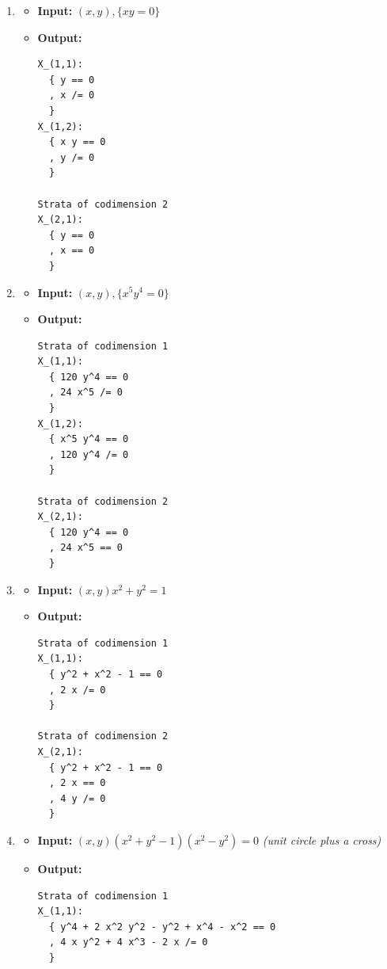 \documentclass[
]{book}
\theoremstyle{definition}
\theoremstyle{definition}
\theoremstyle{definition}
\theoremstyle{definition}
\theoremstyle{remark}
\begin{document}
\begin{enumerate}
\def\labelenumi{\arabic{enumi}.}
\item
  \begin{itemize}
  \item
    \textbf{Input:} \((x,y), \{ xy = 0 \}\)
  \item
    \textbf{Output:}

\begin{verbatim}
X_(1,1):
  { y == 0
  , x /= 0
  }
X_(1,2):
  { x y == 0
  , y /= 0
  }

Strata of codimension 2
X_(2,1):
  { y == 0
  , x == 0
  }
\end{verbatim}
  \end{itemize}
\item
  \begin{itemize}
  \item
    \textbf{Input:} \((x,y), \{ x^5 y^4 = 0 \}\)
  \item
    \textbf{Output:}

\begin{verbatim}
Strata of codimension 1
X_(1,1):
  { 120 y^4 == 0
  , 24 x^5 /= 0
  }
X_(1,2):
  { x^5 y^4 == 0
  , 120 y^4 /= 0
  }

Strata of codimension 2
X_(2,1):
  { 120 y^4 == 0
  , 24 x^5 == 0
  }
\end{verbatim}
  \end{itemize}
\item
  \begin{itemize}
  \item
    \textbf{Input:} \((x,y) x^2 + y^2 = 1\)
  \item
    \textbf{Output:}

\begin{verbatim}
Strata of codimension 1
X_(1,1):
  { y^2 + x^2 - 1 == 0
  , 2 x /= 0
  }

Strata of codimension 2
X_(2,1):
  { y^2 + x^2 - 1 == 0
  , 2 x == 0
  , 4 y /= 0
  }
\end{verbatim}
  \end{itemize}
\item
  \begin{itemize}
  \item
    \textbf{Input:} \((x,y) (x^2 + y^2 - 1)(x^2 - y^2) = 0\) \emph{(unit circle plus a cross)}
  \item
    \textbf{Output:}

\begin{verbatim}
Strata of codimension 1
X_(1,1):
  { y^4 + 2 x^2 y^2 - y^2 + x^4 - x^2 == 0
  , 4 x y^2 + 4 x^3 - 2 x /= 0
  }


\end{verbatim}
\end{itemize}
\end{enumerate}
\end{document}
